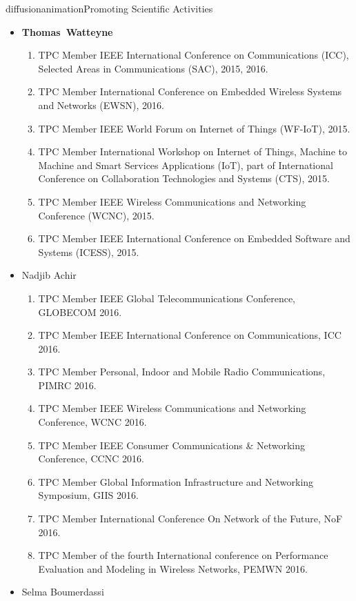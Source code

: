 \documentclass{ra2016}
\newcommand{\thomas}           {\textbf{Thomas~Watteyne}}
\begin{document}
\begin{module}{diffusion}{animation}{Promoting Scientific Activities}
\begin{itemize}
    \item \thomas
        \begin{enumerate}
            \item TPC Member IEEE International Conference on Communications (ICC), Selected Areas in Communications (SAC), 2015, 2016.
            \item TPC Member International Conference on Embedded Wireless Systems and Networks (EWSN), 2016.
            \item TPC Member IEEE World Forum on Internet of Things (WF-IoT), 2015.
            \item TPC Member International Workshop on Internet of Things, Machine to Machine and Smart Services Applications (IoT), part of International Conference on  Collaboration Technologies and Systems (CTS), 2015.
            \item TPC Member IEEE Wireless Communications and Networking Conference (WCNC), 2015.
            \item TPC Member IEEE International Conference on Embedded Software and Systems (ICESS), 2015.
        \end{enumerate}
    \item Nadjib Achir
        \begin{enumerate}
            \item TPC Member IEEE Global Telecommunications Conference, GLOBECOM 2016.
            \item TPC Member IEEE International Conference on Communications, ICC 2016.
            \item TPC Member Personal, Indoor and Mobile Radio Communications, PIMRC 2016.
            \item TPC Member IEEE Wireless Communications and Networking Conference, WCNC 2016.
            \item TPC Member IEEE Consumer Communications \& Networking Conference, CCNC 2016.
            \item TPC Member Global Information Infrastructure and Networking Symposium, GIIS 2016.               
            \item TPC Member International Conference On Network of the Future, NoF 2016.     
            \item TPC Member of the fourth International conference on Performance Evaluation and Modeling in Wireless Networks, PEMWN 2016.     
        \end{enumerate}
    \item Selma Boumerdassi
        \begin{enumerate}      		

\end{enumerate}
\end{itemize}
\end{module}
\end{document}
